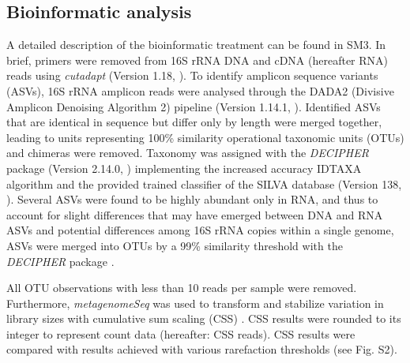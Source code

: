 \documentclass[12pt,a4paper]{article} %
\begin{document}
\subsection*{Bioinformatic analysis}
A detailed description of the bioinformatic treatment can be found in SM3. In brief, primers were removed from 16S rRNA DNA and cDNA (hereafter RNA) reads using \textit{cutadapt} (Version 1.18, \citet{Martin2013}). To identify amplicon sequence variants (ASVs), 16S rRNA amplicon reads were analysed through the DADA2 (Divisive Amplicon Denoising Algorithm 2) pipeline (Version 1.14.1, \citet{Callahan2017}). Identified ASVs that are identical in sequence but differ only by length were merged together, leading to units representing 100\% similarity operational taxonomic units (OTUs) and chimeras were removed. Taxonomy was assigned with the \textit{DECIPHER} package (Version 2.14.0, \citet{Wright2016}) implementing the increased accuracy IDTAXA algorithm \citep{Murali2018} and the provided trained classifier of the SILVA database (Version 138, \citet{Pruesse2007}). Several ASVs were found to be highly abundant only in RNA, and thus to account for slight differences that may have emerged between DNA and RNA ASVs and potential differences among 16S rRNA copies within a single genome, ASVs were merged into OTUs by a 99\% similarity threshold \citep{Vetrovsky2013} with the \textit{DECIPHER} package \citep{Wright2016}.

All OTU observations with less than 10 reads per sample were removed. Furthermore, \textit{metagenomeSeq} was used to transform and stabilize variation in library sizes with cumulative sum scaling (CSS) \citep{Paulson2013}. CSS results were rounded to its integer to represent count data (hereafter: CSS reads). CSS results were compared with results achieved with various rarefaction thresholds (see Fig. S2).
\end{document}
